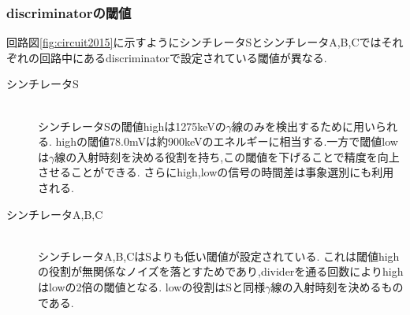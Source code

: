 \subsubsection{discriminatorの閾値}
回路図\ref{fig:circuit2015}に示すようにシンチレータSとシンチレータA,B,Cではそれぞれの回路中にあるdiscriminatorで設定されている閾値が異なる.
\begin{description}
	\item[シンチレータS]\mbox{}\\
		シンチレータSの閾値highは1275keVの$\gamma$線のみを検出するために用いられる.
		highの閾値78.0mVは約900keVのエネルギーに相当する.一方で閾値lowは$\gamma$線の入射時刻を決める役割を持ち,この閾値を下げることで精度を向上させることができる.
		さらにhigh,lowの信号の時間差は事象選別にも利用される.
	\item[シンチレータA,B,C]\mbox{}\\
		シンチレータA,B,CはSよりも低い閾値が設定されている.
		これは閾値highの役割が無関係なノイズを落とすためであり,dividerを通る回数によりhighはlowの2倍の閾値となる.
		lowの役割はSと同様$\gamma$線の入射時刻を決めるものである.
\end{description}


